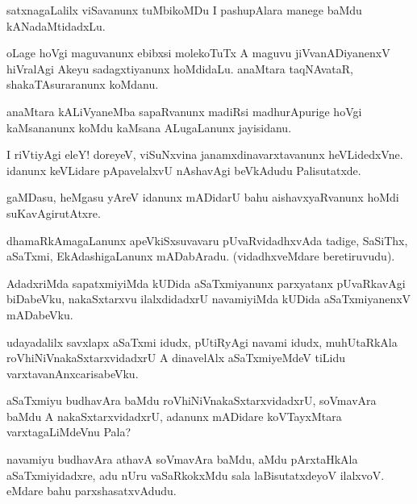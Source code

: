 \begin{mng}
satxnagaLalilx viSavanunx tuMbikoMDu I pashupAlara manege baMdu kANadaMtidadxLu.
\end{mng}

\begin{mng}
oLage hoVgi maguvanunx ebibxsi molekoTuTx A maguvu jiVvanADiyanenxV hiVralAgi Akeyu sadagxtiyanunx hoMdidaLu. anaMtara taqNAvataR, shakaTAsuraranunx koMdanu.
\end{mng}

\begin{mng}
anaMtara kALiVyaneMba sapaRvanunx madiRsi madhurApurige hoVgi kaMsananunx koMdu kaMsana ALugaLanunx jayisidanu.
\end{mng}

\begin{mng}
I riVtiyAgi eleY! doreyeV, viSuNxvina janamxdinavarxtavanunx heVLidedxVne. idanunx keVLidare pApavelalxvU nAshavAgi beVkAdudu Palisutatxde.
\end{mng}

\begin{mng}
gaMDasu, heMgasu yAreV idanunx mADidarU bahu aishavxyaRvanunx hoMdi suKavAgirutAtxre.
\end{mng}

\begin{mng}
dhamaRkAmagaLanunx apeVkiSxsuvavaru pUvaRvidadhxvAda tadige, SaSiThx, aSaTxmi, EkAdashigaLanunx mADabAradu. (vidadhxveMdare beretiruvudu). 
\end{mng}

\begin{mng}
AdadxriMda sapatxmiyiMda kUDida aSaTxmiyanunx parxyatanx pUvaRkavAgi biDabeVku, nakaSxtarxvu ilalxdidadxrU navamiyiMda kUDida aSaTxmiyanenxV mADabeVku.
\end{mng}

\begin{mng}
udayadalilx savxlapx aSaTxmi idudx, pUtiRyAgi navami idudx, muhUtaRkAla roVhiNiVnakaSxtarxvidadxrU A dinavelAlx aSaTxmiyeMdeV tiLidu varxtavanAnxcarisabeVku.
\end{mng}

\begin{mng}
aSaTxmiyu budhavAra baMdu roVhiNiVnakaSxtarxvidadxrU, soVmavAra baMdu A nakaSxtarxvidadxrU, adanunx mADidare koVTayxMtara varxtagaLiMdeVnu Pala?
\end{mng}

\begin{mng}
navamiyu budhavAra athavA soVmavAra baMdu, aMdu pArxtaHkAla aSaTxmiyidadxre, adu nUru vaSaRkokxMdu sala laBisutatxdeyoV ilalxvoV. eMdare bahu parxshasatxvAdudu.
\end{mng}

